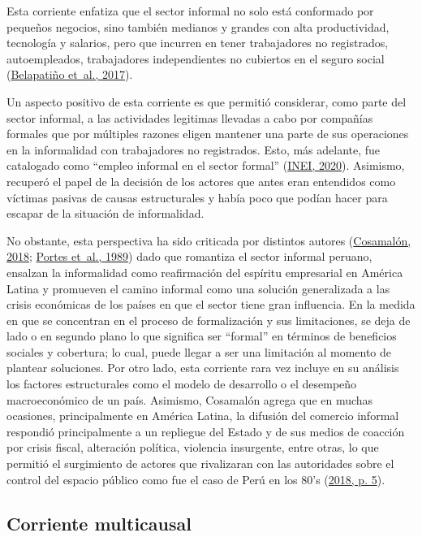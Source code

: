 \documentclass[
  letterpaper,
  12pt,
  oneside,
  spanish,
  doublespacing,
  headsepline,
  parskip]{MastersDoctoralThesis}
\begin{document}
Esta corriente enfatiza que el sector informal no solo está conformado
por pequeños negocios, sino también medianos y grandes con alta
productividad, tecnología y salarios, pero que incurren en tener
trabajadores no registrados, autoempleados, trabajadores independientes
no cubiertos en el seguro social
(\protect\hyperlink{ref-belapatiuxf1o2017}{Belapatiño et~al., 2017}).

Un aspecto positivo de esta corriente es que permitió considerar, como
parte del sector informal, a las actividades legitimas llevadas a cabo
por compañías formales que por múltiples razones eligen mantener una
parte de sus operaciones en la informalidad con trabajadores no
registrados. Esto, más adelante, fue catalogado como ``empleo informal
en el sector formal'' (\protect\hyperlink{ref-inei2020}{INEI, 2020}).
Asimismo, recuperó el papel de la decisión de los actores que antes eran
entendidos como víctimas pasivas de causas estructurales y había poco
que podían hacer para escapar de la situación de informalidad.

No obstante, esta perspectiva ha sido criticada por distintos autores
(\protect\hyperlink{ref-cosamaluxf3n2018}{Cosamalón, 2018};
\protect\hyperlink{ref-theinfo1989}{Portes et~al., 1989}) dado que
romantiza el sector informal peruano, ensalzan la informalidad como
reafirmación del espíritu empresarial en América Latina y promueven el
camino informal como una solución generalizada a las crisis económicas
de los países en que el sector tiene gran influencia. En la medida en
que se concentran en el proceso de formalización y sus limitaciones, se
deja de lado o en segundo plano lo que significa ser ``formal'' en
términos de beneficios sociales y cobertura; lo cual, puede llegar a ser
una limitación al momento de plantear soluciones. Por otro lado, esta
corriente rara vez incluye en su análisis los factores estructurales
como el modelo de desarrollo o el desempeño macroeconómico de un país.
Asimismo, Cosamalón agrega que en muchas ocasiones, principalmente en
América Latina, la difusión del comercio informal respondió
principalmente a un repliegue del Estado y de sus medios de coacción por
crisis fiscal, alteración política, violencia insurgente, entre otras,
lo que permitió el surgimiento de actores que rivalizaran con las
autoridades sobre el control del espacio público como fue el caso de
Perú en los 80's (\protect\hyperlink{ref-cosamaluxf3n2018}{2018, p. 5}).

\hypertarget{corriente-multicausal}{%
\subsection{Corriente multicausal}\label{corriente-multicausal}}
\end{document}
